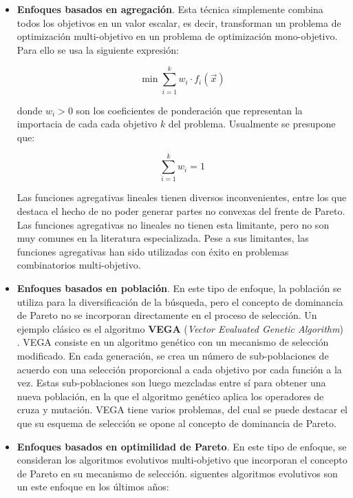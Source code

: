   \begin{itemize}
   \item \textbf{Enfoques basados en agregaci\'on}. Esta t\'ecnica simplemente combina todos los objetivos 
   en un valor escalar, es decir, transforman 
   un problema de optimizaci\'on multi-objetivo en un problema de optimizaci\'on mono-objetivo. Para ello se usa la siguiente 
   expresi\'on: 

	\[ \min {\sum^{k}_{i=1}{w_i\cdot f_i\left(\vec{x}\right)}}\]

   donde $w_i > 0$ son los coeficientes de ponderaci\'on que representan la importacia de cada cada objetivo $k$ del
   problema. Usualmente se presupone que:

   \[\sum^{k}_{i=1}{w_i}=1\]

   Las funciones agregativas lineales tienen diversos inconvenientes, entre los que destaca el hecho de no 
   poder generar partes no convexas del frente de Pareto. Las funciones agregativas no lineales no tienen esta limitante,
   pero no son muy comunes en la literatura especializada. Pese a sus limitantes, las funciones agregativas han sido utilizadas
   con \'exito en problemas combinatorios multi-objetivo.

   \item \textbf{Enfoques basados en poblaci\'on}. En este tipo de enfoque, la poblaci\'on se utiliza para la diversificaci\'on de la b\'usqueda, 
   pero el concepto de dominancia de Pareto no se incorporan directamente en el proceso de selecci\'on. Un ejemplo cl\'asico es el 
   algoritmo \textbf{VEGA} (\textit{Vector Evaluated Genetic Algorithm}) \cite{Schaffer84}. VEGA consiste en un algoritmo gen\'etico 
   con un mecanismo de selecci\'on modificado. En cada generaci\'on, se crea un n\'umero de sub-poblaciones de acuerdo con una 
   selecci\'on proporcional a cada objetivo por cada funci\'on a la vez. Estas sub-poblaciones son luego mezcladas entre s\'i para 
   obtener una nueva poblaci\'on, en la que el algoritmo gen\'etico aplica los operadores de cruza y mutaci\'on. VEGA tiene varios 
   problemas, del cual se puede destacar el que su esquema de selecci\'on se opone al concepto de dominancia de Pareto.

   \item \textbf{Enfoques basados en optimilidad de Pareto}. En este tipo de enfoque, se consideran los algoritmos evolutivos multi-objetivo que 
   incorporan el concepto de Pareto en su mecanismo de selecci\'on. \DIFdelbegin {}\DIFdelend \DIFaddbegin {}\DIFaddend siguentes algoritmos evolutivos son un \DIFdelbegin {}\DIFdelend \DIFaddbegin {}\DIFaddend este enfoque en los \'ultimos a\~nos:


\end{itemize}
